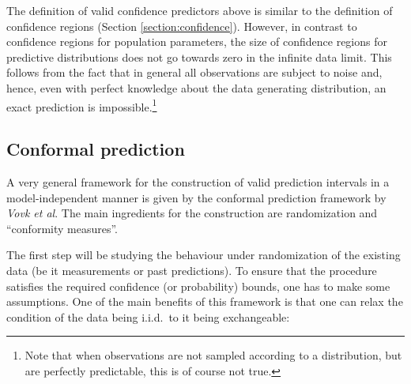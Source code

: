     \begin{remark}
        The definition of valid confidence predictors above is similar to the definition of confidence regions (Section \ref{section:confidence}). However, in contrast to confidence regions for population parameters, the size of confidence regions for predictive distributions does not go towards zero in the infinite data limit. This follows from the fact that in general all observations are subject to noise and, hence, even with perfect knowledge about the data generating distribution, an exact prediction is impossible.\footnote{Note that when observations are not sampled according to a distribution, but are perfectly predictable, this is of course not true.}
    \end{remark}

\subsection{Conformal prediction}

    A very general framework for the construction of valid prediction intervals in a model-independent manner is given by the conformal prediction framework by \textit{Vovk et al}. The main ingredients for the construction are randomization and ``conformity measures''.

    The first step will be studying the behaviour under randomization of the existing data (be it measurements or past predictions). To ensure that the procedure satisfies the required confidence (or probability) bounds, one has to make some assumptions. One of the main benefits of this framework is that one can relax the condition of the data being i.i.d.~to it being exchangeable:

